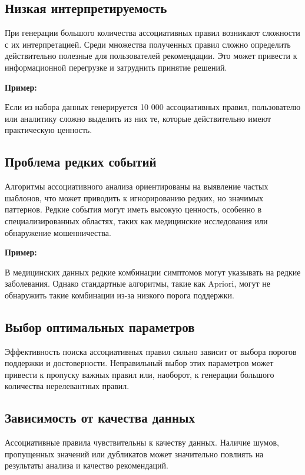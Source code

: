 \subsection{Низкая интерпретируемость}

При генерации большого количества ассоциативных правил возникают сложности с их интерпретацией. Среди множества полученных правил сложно определить действительно полезные для пользователей рекомендации. Это может привести к информационной перегрузке и затруднить принятие решений.

\textbf{Пример:}

Если из набора данных генерируется 10 000 ассоциативных правил, пользователю или аналитику сложно выделить из них те, которые действительно имеют практическую ценность.

\subsection{Проблема редких событий}

Алгоритмы ассоциативного анализа ориентированы на выявление частых шаблонов, что может приводить к игнорированию редких, но значимых паттернов. Редкие события могут иметь высокую ценность, особенно в специализированных областях, таких как медицинские исследования или обнаружение мошенничества.

\textbf{Пример:}

В медицинских данных редкие комбинации симптомов могут указывать на редкие заболевания. Однако стандартные алгоритмы, такие как Apriori, могут не обнаружить такие комбинации из-за низкого порога поддержки.

\subsection{Выбор оптимальных параметров}

Эффективность поиска ассоциативных правил сильно зависит от выбора порогов поддержки и достоверности. Неправильный выбор этих параметров может привести к пропуску важных правил или, наоборот, к генерации большого количества нерелевантных правил.

\subsection{Зависимость от качества данных}

Ассоциативные правила чувствительны к качеству данных. Наличие шумов, пропущенных значений или дубликатов может значительно повлиять на результаты анализа и качество рекомендаций.

